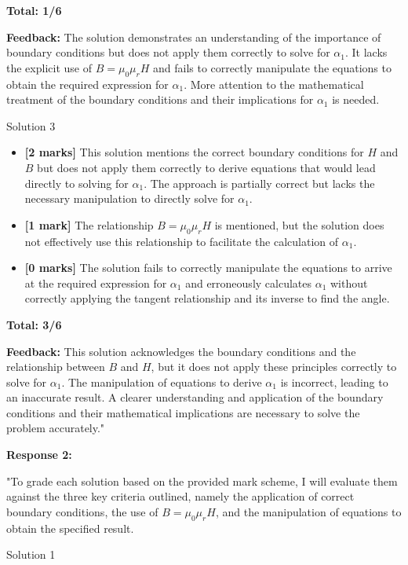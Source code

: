 \documentclass[a4paper,11pt]{article}
\begin{document}
\textbf{Total: 1/6}

\textbf{Feedback:} The solution demonstrates an understanding of the importance of boundary conditions but does not apply them correctly to solve for \( \alpha_1 \). It lacks the explicit use of \( B = \mu_0 \mu_r H \) and fails to correctly manipulate the equations to obtain the required expression for \( \alpha_1 \). More attention to the mathematical treatment of the boundary conditions and their implications for \( \alpha_1 \) is needed.

Solution 3

\begin{itemize}
    \item \textbf{[2 marks]} This solution mentions the correct boundary conditions for \( H \) and \( B \) but does not apply them correctly to derive equations that would lead directly to solving for \( \alpha_1 \). The approach is partially correct but lacks the necessary manipulation to directly solve for \( \alpha_1 \).
    \item \textbf{[1 mark]} The relationship \( B = \mu_0 \mu_r H \) is mentioned, but the solution does not effectively use this relationship to facilitate the calculation of \( \alpha_1 \).
    \item \textbf{[0 marks]} The solution fails to correctly manipulate the equations to arrive at the required expression for \( \alpha_1 \) and erroneously calculates \( \alpha_1 \) without correctly applying the tangent relationship and its inverse to find the angle.
\end{itemize}

\textbf{Total: 3/6}

\textbf{Feedback:} This solution acknowledges the boundary conditions and the relationship between \( B \) and \( H \), but it does not apply these principles correctly to solve for \( \alpha_1 \). The manipulation of equations to derive \( \alpha_1 \) is incorrect, leading to an inaccurate result. A clearer understanding and application of the boundary conditions and their mathematical implications are necessary to solve the problem accurately."

\textbf{Response 2:}

"To grade each solution based on the provided mark scheme, I will evaluate them against the three key criteria outlined, namely the application of correct boundary conditions, the use of \( B = \mu_0 \mu_r H \), and the manipulation of equations to obtain the specified result.

Solution 1
\end{document}
